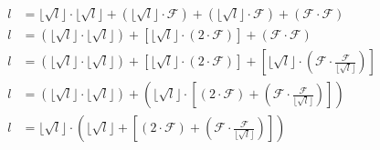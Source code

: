 \begin{Proof}
\begin{align*}
l& = \lfloor\sqrt{l}\rfloor \cdot \lfloor\sqrt{l}\rfloor + (\lfloor\sqrt{l}\rfloor \cdot \mathcal{F}) + (\lfloor\sqrt{l}\rfloor \cdot \mathcal{F}) + (\mathcal{F} \cdot \mathcal{F})\\
l& = (\lfloor\sqrt{l}\rfloor \cdot \lfloor\sqrt{l}\rfloor) + [\lfloor\sqrt{l}\rfloor \cdot (2 \cdot \mathcal{F})] + (\mathcal{F} \cdot \mathcal{F})\\
l& = (\lfloor\sqrt{l}\rfloor \cdot \lfloor\sqrt{l}\rfloor) + [\lfloor\sqrt{l}\rfloor \cdot (2 \cdot \mathcal{F})] + \left[\lfloor\sqrt{l}\rfloor \cdot \left(\mathcal{F} \cdot \frac{\mathcal{F}}{\lfloor\sqrt{l}\rfloor}\right)\right]\\
l& = (\lfloor\sqrt{l}\rfloor \cdot \lfloor\sqrt{l}\rfloor) + \left(\lfloor\sqrt{l}\rfloor \cdot \left[(2 \cdot \mathcal{F}) + \left(\mathcal{F} \cdot \frac{\mathcal{F}}{\lfloor\sqrt{l}\rfloor}\right)\right]\right)\\
l& = \lfloor\sqrt{l}\rfloor \cdot \left(\lfloor\sqrt{l}\rfloor + \left[(2 \cdot \mathcal{F}) + \left(\mathcal{F} \cdot \frac{\mathcal{F}}{\lfloor\sqrt{l}\rfloor}\right)\right]\right)
\end{align*}



\end{Proof}
